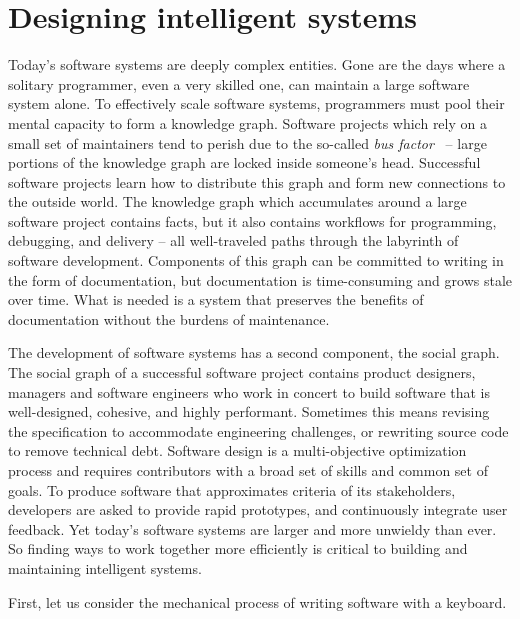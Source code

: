 \documentclass[12pt,initial,twoside,maitrise]{dms}
\numberwithin{equation}{section}
\numberwithin{table}{chapter}
\numberwithin{figure}{chapter}
\begin{document}
\section{Designing intelligent systems}

Today's software systems are deeply complex entities. Gone are the days where a solitary programmer, even a very skilled one, can maintain a large software system alone. To effectively scale software systems, programmers must pool their mental capacity to form a knowledge graph. Software projects which rely on a small set of maintainers tend to perish due to the so-called \textit{bus factor}~\cite{cosentino2015assessing} -- large portions of the knowledge graph are locked inside someone's head. Successful software projects learn how to distribute this graph and form new connections to the outside world. The knowledge graph which accumulates around a large software project contains facts, but it also contains workflows for programming, debugging, and delivery -- all well-traveled paths through the labyrinth of software development. Components of this graph can be committed to writing in the form of documentation, but documentation is time-consuming and grows stale over time. What is needed is a system that preserves the benefits of documentation without the burdens of maintenance.

The development of software systems has a second component, the social graph. The social graph of a successful software project contains product designers, managers and software engineers who work in concert to build software that is well-designed, cohesive, and highly performant. Sometimes this means revising the specification to accommodate engineering challenges, or rewriting source code to remove technical debt. Software design is a multi-objective optimization process and requires contributors with a broad set of skills and common set of goals. To produce software that approximates criteria of its stakeholders, developers are asked to provide rapid prototypes, and continuously integrate user feedback. Yet today's software systems are larger and more unwieldy than ever. So finding ways to work together more efficiently is critical to building and maintaining intelligent systems.

First, let us consider the mechanical process of writing software with a keyboard.
\end{document}
